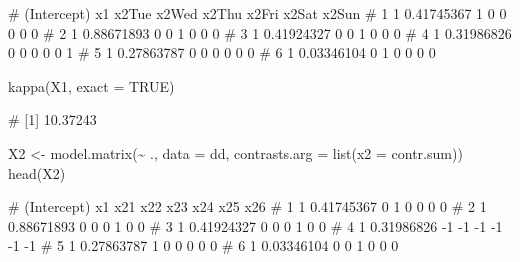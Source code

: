 \documentclass[
  a4paper,
]{article}
\newenvironment{Shaded}{\begin{snugshade}}{\end{snugshade}}
\newcommand{\AttributeTok}[1]{\textcolor[rgb]{0.77,0.63,0.00}{#1}}
\newcommand{\ConstantTok}[1]{\textcolor[rgb]{0.00,0.00,0.00}{#1}}
\newcommand{\FunctionTok}[1]{\textcolor[rgb]{0.00,0.00,0.00}{#1}}
\newcommand{\NormalTok}[1]{#1}
\newcommand{\OtherTok}[1]{\textcolor[rgb]{0.56,0.35,0.01}{#1}}
\newcommand{\SpecialCharTok}[1]{\textcolor[rgb]{0.00,0.00,0.00}{#1}}
\theoremstyle{definition}
\theoremstyle{definition}
\theoremstyle{definition}
\theoremstyle{definition}
\theoremstyle{remark}
\begin{document}
\begin{Shaded}
\begin{Highlighting}[]
\NormalTok{\#   (Intercept)         x1 x2Tue x2Wed x2Thu x2Fri x2Sat x2Sun}
\NormalTok{\# 1           1 0.41745367     1     0     0     0     0     0}
\NormalTok{\# 2           1 0.88671893     0     0     1     0     0     0}
\NormalTok{\# 3           1 0.41924327     0     0     1     0     0     0}
\NormalTok{\# 4           1 0.31986826     0     0     0     0     0     1}
\NormalTok{\# 5           1 0.27863787     0     0     0     0     0     0}
\NormalTok{\# 6           1 0.03346104     0     1     0     0     0     0}
\end{Highlighting}
\end{Shaded}

\begin{Shaded}
\begin{Highlighting}[]
\FunctionTok{kappa}\NormalTok{(X1, }\AttributeTok{exact =} \ConstantTok{TRUE}\NormalTok{)}
\end{Highlighting}
\end{Shaded}

\begin{Shaded}
\begin{Highlighting}[]
\NormalTok{\# [1] 10.37243}
\end{Highlighting}
\end{Shaded}

\begin{Shaded}
\begin{Highlighting}[]
\NormalTok{X2 }\OtherTok{\textless{}{-}} \FunctionTok{model.matrix}\NormalTok{(}\SpecialCharTok{\textasciitilde{}}\NormalTok{ ., }\AttributeTok{data =}\NormalTok{ dd,}
                   \AttributeTok{contrasts.arg =} \FunctionTok{list}\NormalTok{(}\AttributeTok{x2 =}\NormalTok{ contr.sum))}
\FunctionTok{head}\NormalTok{(X2)}
\end{Highlighting}
\end{Shaded}

\begin{Shaded}
\begin{Highlighting}[]
\NormalTok{\#   (Intercept)         x1 x21 x22 x23 x24 x25 x26}
\NormalTok{\# 1           1 0.41745367   0   1   0   0   0   0}
\NormalTok{\# 2           1 0.88671893   0   0   0   1   0   0}
\NormalTok{\# 3           1 0.41924327   0   0   0   1   0   0}
\NormalTok{\# 4           1 0.31986826  {-}1  {-}1  {-}1  {-}1  {-}1  {-}1}
\NormalTok{\# 5           1 0.27863787   1   0   0   0   0   0}
\NormalTok{\# 6           1 0.03346104   0   0   1   0   0   0}
\end{Highlighting}
\end{Shaded}
\end{document}
